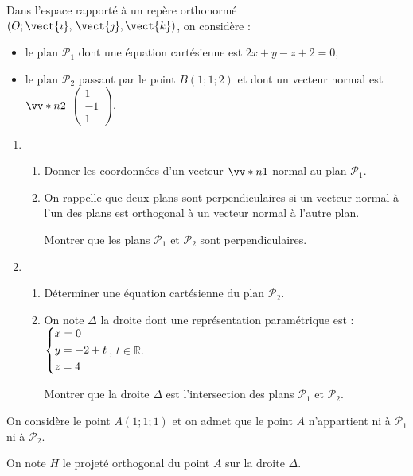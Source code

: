 Dans l’espace rapporté à un repère orthonormé $\left(O;\vect{\imath},\,\vect{\jmath}, \vect{k} \right)$, on considère : 

\begin{itemize}
	\item le plan $\mathcal{P}_1$ dont une équation cartésienne est $2x + y - z + 2 = 0$,
	\item le plan $\mathcal{P}_2$ passant par le point $B(1;1;2)$ et dont un vecteur normal est $\vv*{n}{2}$ $\begin{pmatrix}1\\-1\\1\end{pmatrix}$.
\end{itemize}

\begin{enumerate}
	\item 
	\begin{enumerate}
		\item Donner les coordonnées d’un vecteur $\vv*{n}{1}$ normal au plan $\mathcal{P}_1$.
		\item On rappelle que deux plans sont perpendiculaires si un vecteur normal à l’un des plans est orthogonal à un vecteur normal à l’autre plan.
		
		Montrer que les plans $\mathcal{P}_1$ et $\mathcal{P}_2$ sont perpendiculaires. 
	\end{enumerate}
	\item 
	\begin{enumerate}
		\item Déterminer une équation cartésienne du plan $\mathcal{P}_2$.
		\item On note $\Delta$ la droite dont une représentation paramétrique est : $\begin{dcases} x=0 \\ y=-2+t \\ z=4 \end{dcases}$, $t \in \mathbb{R}$.
		
		Montrer que la droite $\Delta$ est l’intersection des plans $\mathcal{P}_1$ et $\mathcal{P}_2$. 
	\end{enumerate}
\end{enumerate}

On considère le point $A(1;1;1)$ et on admet que le point $A$ n’appartient ni à  $\mathcal{P}_1$ ni à $\mathcal{P}_2$.

On note $H$ le projeté orthogonal du point $A$ sur la droite $\Delta$.

